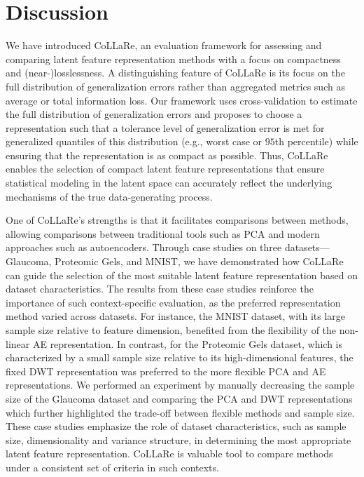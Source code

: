 \section{Discussion}\label{sec:discussion}

We have introduced CoLLaRe, an evaluation framework for assessing and comparing latent feature representation methods with a focus on compactness and (near-)losslessness.
A distinguishing feature of CoLLaRe is its focus on the full distribution of generalization errors rather than aggregated metrics such as average or total information loss.
Our framework uses cross-validation to estimate the full distribution of generalization errors and proposes to choose a representation such that a tolerance level of generalization error is met for generalized quantiles of this distribution (e.g., worst case or $95$th percentile) while ensuring that the representation is as compact as possible.
Thus, CoLLaRe enables the selection of compact latent feature representations that ensure statistical modeling in the latent space can accurately reflect the underlying mechanisms of the true data-generating process.




One of CoLLaRe's strengths is that it facilitates comparisons between methods, allowing comparisons between traditional tools such as PCA and modern approaches such as autoencoders. 
Through case studies on three datasets—Glaucoma, Proteomic Gels, and MNIST, we have demonstrated how CoLLaRe can guide the selection of the most suitable latent feature representation based on dataset characteristics.
The results from these case studies reinforce the importance of such context-specific evaluation, as the preferred representation method varied across datasets. 
For instance, the MNIST dataset, with its large sample size relative to feature dimension, benefited from the flexibility of the non-linear AE representation. 
In contrast, for the Proteomic Gels dataset, which is characterized by a small sample size relative to its high-dimensional features, the fixed DWT representation was preferred to the more flexible PCA and AE representations.
We performed an experiment by manually decreasing the sample size of the Glaucoma dataset and comparing the PCA and DWT representations which further highlighted the trade-off between flexible methods and sample size.
These case studies emphasize the role of dataset characteristics, such as sample size, dimensionality and variance structure, in determining the most appropriate latent feature representation. 
CoLLaRe is valuable tool to compare methods under a consistent set of criteria in such contexts.

